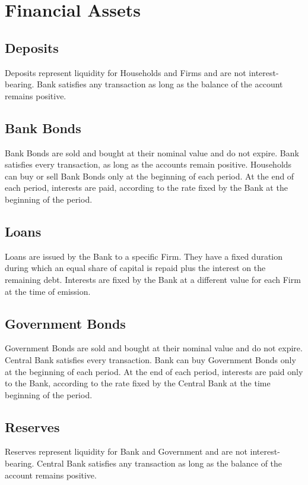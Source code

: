 \documentclass[a4paper, headings=standardclasses]{scrartcl}
\begin{document}
\section{Financial Assets}

\subsection{Deposits}
Deposits represent liquidity for Households and Firms and are not interest-bearing. Bank satisfies any transaction as long as the balance of the account remains positive.

\subsection{Bank Bonds}
Bank Bonds are sold and bought at their nominal value and do not expire. Bank satisfies every transaction, as long as the accounts remain positive. Households can buy or sell Bank Bonds only at the beginning of each period. At the end of each period, interests are paid, according to the rate fixed by the Bank at the beginning of the period.

\subsection{Loans}
Loans are issued by the Bank to a specific Firm. They have a fixed duration during which an equal share of capital is repaid plus the interest on the remaining debt. Interests are fixed by the Bank at a different value for each Firm at the time of emission.

\subsection{Government Bonds}
Government Bonds are sold and bought at their nominal value and do not expire. Central Bank satisfies every transaction. Bank can buy Government Bonds only at the beginning of each period. At the end of each period, interests are paid only to the Bank, according to the rate fixed by the Central Bank at the time beginning of the period.

\subsection{Reserves}
Reserves represent liquidity for Bank and Government and are not interest-bearing. Central Bank satisfies any transaction as long as the balance of the account remains positive.
\end{document}
